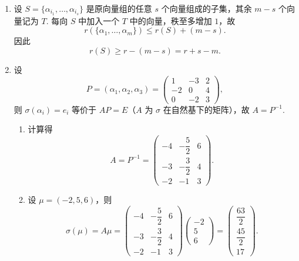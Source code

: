 \begin{enumerate}
\begin{enumerate}
        \item 对 $\alpha_1,\alpha_2,\alpha_3$ 作 Schmidt 正交化：
        \[
            v_1=\alpha_1=(2,1,1,0,0),
        \]
        \[
            v_2=\alpha_2-\frac{\langle\alpha_2,v_1\rangle}{\|v_1\|^2}v_1
            =\alpha_2-\frac12\alpha_1=(0,\tfrac12,-\tfrac12,0,1),
        \]
        取 $w_2=(0,1,-1,0,2)$，则 $\|w_2\|^2=6$；
        \[
            v_3=\alpha_3-\frac{\langle\alpha_3,v_1\rangle}{\|v_1\|^2}v_1
            -\frac{\langle\alpha_3,w_2\rangle}{\|w_2\|^2}w_2
            =(\tfrac23,-1,-\tfrac13,1,\tfrac13),
        \]
        取 $w_3=(2,-3,-1,3,1)$，则 $\|w_3\|^2=24$. 故 $W$ 的一组单位正交基为
        \[
            \frac{1}{\sqrt6}(2,1,1,0,0),\quad
            \frac{1}{\sqrt6}(0,1,-1,0,2),\quad
            \frac{1}{\sqrt{24}}(2,-3,-1,3,1).
        \]
    \end{enumerate}

    \item 设 $S=\{\alpha_{i_1},\ldots,\alpha_{i_s}\}$ 是原向量组的任意 $s$ 个向量组成的子集，其余 $m-s$ 个向量记为 $T$. 每向 $S$ 中加入一个 $T$ 中的向量，秩至多增加 $1$，故
    \[
        r(\{\alpha_1,\ldots,\alpha_m\})\leqslant r(S)+(m-s).
    \]
    因此
    \[
        r(S)\geqslant r-(m-s)=r+s-m.
    \]

    \item 设
    \[
        P=(\alpha_1,\alpha_2,\alpha_3)=
        \begin{pmatrix}
            1&-3&2\\
            -2&0&4\\
            0&-2&3
        \end{pmatrix},
    \]
    则 $\sigma(\alpha_i)=e_i$ 等价于 $AP=E$（$A$ 为 $\sigma$ 在自然基下的矩阵），故 $A=P^{-1}$.
    \begin{enumerate}
        \item 计算得
        \[
            A=P^{-1}=
            \begin{pmatrix}
                -4&-\dfrac52&6\\[4pt]
                -3&-\dfrac32&4\\[4pt]
                -2&-1&3
            \end{pmatrix}.
        \]

        \item 设 $\mu=(-2,5,6)$，则
        \[
            \sigma(\mu)=A\mu
            =\begin{pmatrix}
                -4&-\dfrac52&6\\[4pt]
                -3&-\dfrac32&4\\[4pt]
                -2&-1&3
            \end{pmatrix}
            \begin{pmatrix}-2\\5\\6\end{pmatrix}
            =\begin{pmatrix}\dfrac{63}{2}\\[4pt]\dfrac{45}{2}\\[4pt]17\end{pmatrix}.
        \]
    \end{enumerate}


\end{enumerate}
